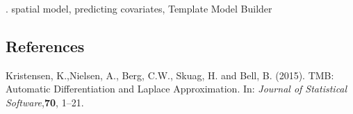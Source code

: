 \documentclass[12pt]{article}
\begin{document}
.
spatial model, predicting covariates, Template Model Builder


%        
%
%        

\subsection*{References}

\begin{description}

\item
Kristensen, K.,Nielsen, A., Berg, C.W., Skuag, H. and Bell, B. (2015).
TMB: Automatic Differentiation and Laplace Approximation.
In: \textit{Journal of Statistical Software},\textbf{70}, 1--21.

\end{description}
\end{document}
